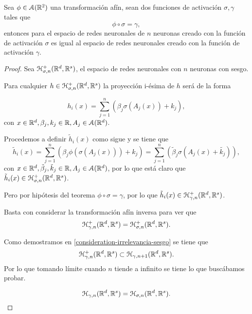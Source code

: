 \begin{aportacionOriginal}

\begin{teorema}\label{teo:eficacia-funciones-activation}
    Sea $\phi \in \mathcal{A}(\mathbb{R}^2)$ una transformación afín, sean dos funciones de activación $\sigma, \gamma$ tales que 
    \begin{equation*}
        \phi \circ \sigma = \gamma,
    \end{equation*}
    entonces para 
    el espacio de redes neuronales de $n$ neuronas creado con la función de activación $\sigma$ es  
    igual al espacio de redes neuronales creado con la función de activación $\gamma$. 
\end{teorema}
\begin{proof}

    Sea $\mathcal{H}^+_{\sigma, n}(\mathbb{R}^d, \mathbb{R}^s)$, el espacio de redes neuronales con $n$ neuronas con sesgo. 

    Para cualquier $h  \in \mathcal{H}^+_{\sigma, n}(\mathbb{R}^d, \mathbb{R}^s)$
    la proyección i-ésima de $h$ será de la forma 

    \begin{equation*}
        h_i(x) = \sum^n_{j=1}(\beta_{j} \sigma(A_j(x))+ k_j),
    \end{equation*}
    con $x \in \mathbb{R}^d, \beta_{j}, k_j \in \mathbb{R}, A_j \in \mathcal{A}(\mathbb{R}^d)$. 

    Procedemos a definir $\tilde{h}_i(x)$ como sigue y
    se tiene que 
    \begin{equation*}
        \tilde{h}_i(x) 
        = \sum^n_{j=1}(\beta_{j}  \phi(\sigma(A_j(x)))+ k_j)
        = \sum^n_{j=1}(\tilde{\beta}_{j} \sigma(A_j(x)+ \tilde{k_j})),
    \end{equation*}
    con $x \in \mathbb{R}^d, \tilde \beta_{j}, \tilde k_j \in \mathbb{R}, A_j \in \mathcal{A}(\mathbb{R}^d)$,
    por lo que está claro que $\tilde{h}_i(x) \in \mathcal{H}^+_{\sigma, n}(\mathbb{R}^d, \mathbb{R}^s)$. 

    Pero por hipótesis del teorema $\phi \circ \sigma = \gamma$, por lo que $\tilde{h}_i(x) \in \mathcal{H}^+_{\gamma, n}(\mathbb{R}^d, \mathbb{R}^s)$. 

    Basta con considerar la transformación afín inversa para ver que
    \begin{equation*}
        \mathcal{H}^+_{\gamma, n}(\mathbb{R}^d, \mathbb{R}^s) = \mathcal{H}^+_{\sigma, n}(\mathbb{R}^d, \mathbb{R}^s).
    \end{equation*}

    Como demostramos en \ref{consideration-irrelevancia-sesgo} se tiene que 
    \begin{equation*}
        \mathcal{H}^+_{\gamma, n}(\mathbb{R}^d, \mathbb{R}^s) \subset \mathcal{H}_{\gamma, n+1}(\mathbb{R}^d, \mathbb{R}^s).
    \end{equation*}
    Por lo que tomando límite cuando $n$ tiende a infinito se tiene lo que buscábamos probar.

    \begin{equation*}
        \mathcal{H}_{\gamma, n}(\mathbb{R}^d, \mathbb{R}^s) = \mathcal{H}_{\sigma, n}(\mathbb{R}^d, \mathbb{R}^s).
    \end{equation*}
\end{proof}
\end{aportacionOriginal}

